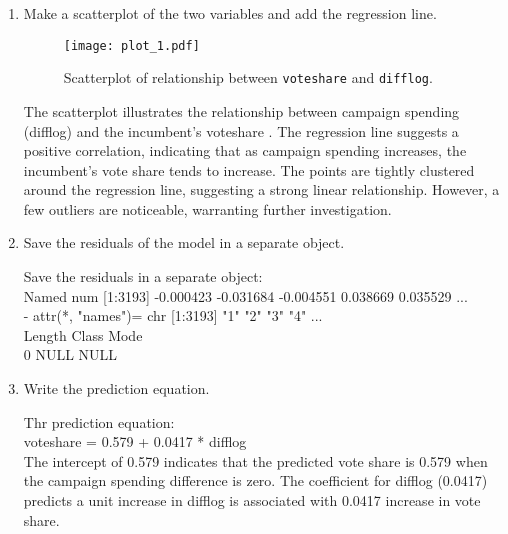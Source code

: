 \documentclass[12pt,letterpaper]{article}
\begin{document}
\begin{enumerate}
		
		
		\item Make a scatterplot of the two variables and add the regression line. 		
		\vspace{.15cm}
		 
		\vspace{.15cm}
		\begin{figure}[h!]\centering
			
			\caption{\footnotesize Scatterplot of relationship between \texttt{voteshare}  and  \texttt{difflog}.}
			\label{fig:plot_1}
			\texttt{[image: plot\_1.pdf]}
		\end{figure}
		\noindent The scatterplot illustrates the relationship between campaign spending (difflog) and the incumbent's voteshare . The regression line suggests a positive correlation, indicating that as campaign spending increases, the incumbent's vote share tends to increase. The points are tightly clustered around the regression line, suggesting a strong linear relationship. However, a few outliers are noticeable, warranting further investigation. 
		\vspace{80.15cm}
		\item Save the residuals of the model in a separate object.
		
		\vspace{.15cm}
		 
		\vspace{.15cm}
		\noindent Save the residuals in a separate object:\\
		Named num [1:3193] -0.000423 -0.031684 -0.004551 0.038669 0.035529 ...\\
		- attr(*, "names")= chr [1:3193] "1" "2" "3" "4" ...\\
		Length  Class   Mode \\
		0   NULL   NULL \\
		\item Write the prediction equation.
		
		\vspace{.15cm}
		 
		\vspace{.15cm}
		\noindent Thr prediction equation:\\
		\vspace{.15cm}
		voteshare = 0.579 + 0.0417  * difflog\\
		\noindent The intercept of 0.579 indicates that the predicted vote share is 0.579 when the campaign spending difference is zero. 
		The coefficient for difflog (0.0417) predicts a unit increase in difflog is associated with 0.0417 increase in vote share.
		
	\end{enumerate}
	
\end{document}
